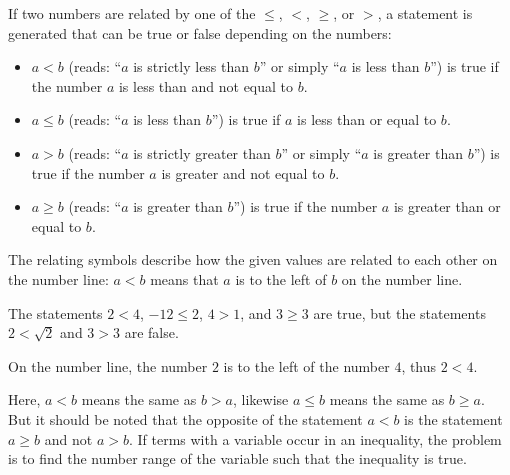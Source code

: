 \begin{MIntro}

\begin{MInfo}
If two numbers are related by one of the  
$\leq$, $<$, $\geq$, or $>$, a statement is generated that can be true or false depending on 
the numbers:
\begin{itemize}
\item{$a<b$ (reads: ``$a$ is strictly less than $b$'' or simply ``$a$ is less than $b$'') is true if the number $a$ is less than and not equal to $b$.}
\item{$a \leq b$ (reads: ``$a$ is less than $b$'') is true if $a$ is less than or equal to $b$.}
\item{$a>b$ (reads: ``$a$ is strictly greater than $b$'' or simply ``$a$ is greater than $b$'') is true if the number $a$ is greater and not equal to $b$.}
\item{$a \geq b$ (reads: ``$a$ is greater than $b$'') is true if the number $a$ is greater than or equal to $b$.}
\end{itemize}
\end{MInfo}

The relating symbols describe how the given values are related to each other on the number line: 
$a<b$ means that $a$ is to the left of $b$ on the number line.

\begin{MExample}
The statements $2<4$, $-12\leq 2$, $4>1$, and $3\geq 3$ are true,
but the statements $2<\sqrt2$ and $3>3$ are false.

\begin{center}
%

On the number line, the number $2$ is to the left of the number $4$, thus $2<4$.
\end{center}

\end{MExample}

Here, $a<b$ means the same as $b>a$, likewise $a\leq b$ means the same as $b\geq a$. But it
should be noted that the opposite of the statement $a<b$ is the statement $a\geq b$ and not
$a>b$. If terms with a variable occur in an inequality, the problem is to find the number range
of the variable such that the inequality is true. 
\end{MIntro}

